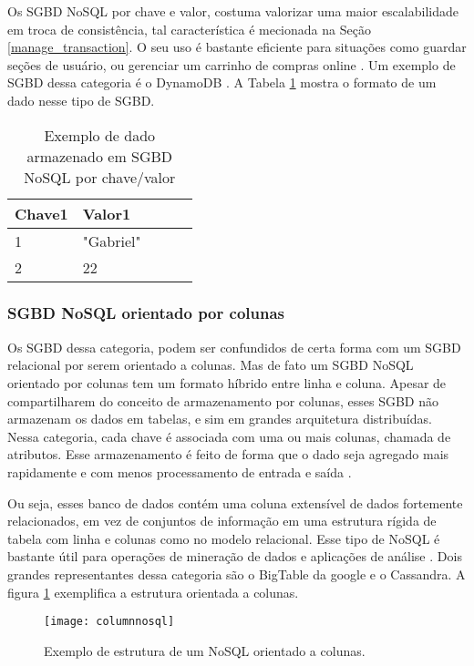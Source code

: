 	Os SGBD NoSQL por chave e valor, costuma valorizar uma maior escalabilidade em troca de consistência, tal característica é mecionada na Seção \ref{manage_transaction}. O seu uso é bastante eficiente para situações como guardar seções de usuário, ou gerenciar um carrinho de compras online \cite{nayak2013type}. Um exemplo de SGBD dessa categoria é o DynamoDB \cite{DeCandia:2007:DAH:1323293.1294281}. A Tabela \ref{table:keyvalue} mostra o formato de um dado nesse tipo de SGBD.
	
\begin{table}[h!]
\centering
\caption{Exemplo de dado armazenado em SGBD NoSQL por chave/valor}
\begin{tabular}{|l|l|l|l|l|}
\hline
Chave1 & Valor1 \\ \hline
1 & "Gabriel" \\ \hline
2 & 22 \\ \hline
\end{tabular}
\label{table:keyvalue}
\end{table}
	
\subsubsection{SGBD NoSQL orientado por colunas}
	Os SGBD dessa categoria, podem ser confundidos de certa forma com um SGBD relacional por serem orientado a colunas. Mas de fato um SGBD NoSQL orientado por colunas tem um formato híbrido entre linha e coluna. Apesar de compartilharem do conceito de armazenamento por colunas, esses SGBD não armazenam os dados em tabelas, e sim em grandes arquitetura distribuídas. Nessa categoria, cada chave é associada com uma ou mais colunas, chamada de atributos. Esse armazenamento é feito de forma que o dado seja agregado mais rapidamente e com menos processamento de entrada e saída \cite{nayak2013type}.
	
	Ou seja, esses banco de dados contém uma coluna extensível de dados fortemente relacionados, em vez de conjuntos de informação em uma estrutura rígida de tabela com linha e colunas como no modelo relacional\cite{kauremerging}. Esse tipo de NoSQL é bastante útil para operações de mineração de dados e aplicações de análise \cite{nayak2013type}. Dois grandes representantes dessa categoria são o BigTable da google \cite{Chang:2008:BDS:1365815.1365816} e o Cassandra. A figura \ref{fig:columnnosql} exemplifica a estrutura orientada a colunas.
	
\begin{figure}[H]
	\centering
    \texttt{[image: columnnosql]}
    \caption{Exemplo de estrutura de um NoSQL orientado a colunas.}
    \label{fig:columnnosql}
\end{figure}
	

